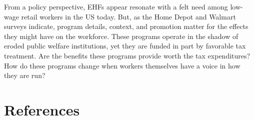 \documentclass[
  11pt,
  oneside]{article}
\begin{document}
From a policy perspective, EHFs appear resonate with a felt need among low-wage retail workers in the US today. But, as the Home Depot and Walmart surveys indicate, program details, context, and promotion matter for the effects they might have on the workforce. These programs operate in the shadow of eroded public welfare institutions, yet they are funded in part by favorable tax treatment. Are the benefits these programs provide worth the tax expenditures? How do these programs change when workers themselves have a voice in how they are run?

\section*{References}\label{references}
\end{document}
